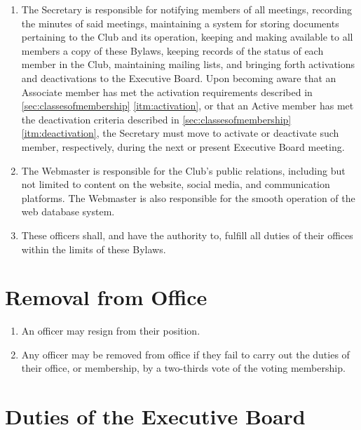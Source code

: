 \documentclass[12pt,letterpaper,oneside]{book}
\begin{document}
\begin{enumerate}
\item The Secretary is responsible for notifying members of all meetings, recording the minutes of said meetings, maintaining a system for storing documents pertaining to the Club and its operation, keeping and making available to all members a copy of these Bylaws, keeping records of the status of each member in the Club, maintaining mailing lists, and bringing forth activations and deactivations to the Executive Board. Upon becoming aware that an Associate member has met the activation requirements described in \cref{sec:classesofmembership} \cref{itm:activation}, or that an Active member has met the deactivation criteria described in \cref{sec:classesofmembership} \cref{itm:deactivation}, the Secretary must move to activate or deactivate such member, respectively, during the next or present Executive Board meeting.
\item The Webmaster is responsible for the Club’s public relations, including but not limited to content on the website, social media, and communication platforms. The Webmaster is also responsible for the smooth operation of the web database system.
\item These officers shall, and have the authority to, fulfill all duties of their offices within the limits of these Bylaws.

\end{enumerate}

\section{Removal from Office}

\begin{enumerate}

\item An officer may resign from their position.
\item Any officer may be removed from office if they fail to carry out the duties of their office, or membership, by a two-thirds vote of the voting membership.

\end{enumerate}

\section{Duties of the Executive Board}
\end{document}
